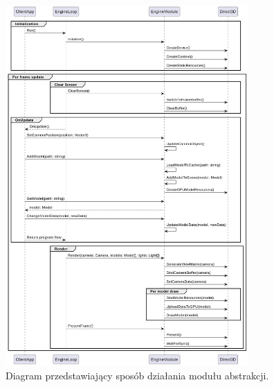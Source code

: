 \begin{figure}[ht!]
	\centering
	\includegraphics[width=350px]{uml/module_type_final.png}
	\caption{Diagram przedstawiający sposób działania modułu abstrakcji.}
	\label{UML_Sequence_Module_Final}
\end{figure}

